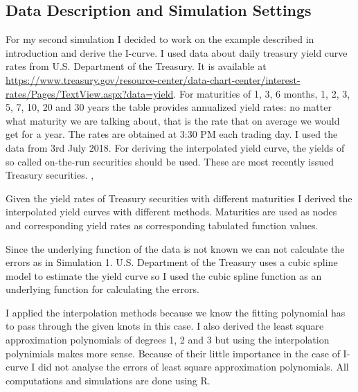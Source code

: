 \documentclass[a4paper,10pt]{article}
\begin{document}
\subsection{Data Description and Simulation Settings}
For my second simulation I decided to work on the example described in introduction and derive the I-curve. 
I used data about daily treasury yield curve rates from U.S. Department of the Treasury. 
It is available at \url{https://www.treasury.gov/resource-center/data-chart-center/interest-rates/Pages/TextView.aspx?data=yield}.
For maturities of 1, 3, 6 months, 1, 2, 3, 5, 7, 10, 20 and 30 years the table provides annualized yield rates: no matter what maturity we are talking about, that is the rate that on average we would get for a year.
The rates are obtained at 3:30 PM each trading day. I used the data from 3rd July 2018.
For deriving the interpolated yield curve, the yields of so called on-the-run securities should be used. These are most recently issued Treasury securities. \cite{podatki}, \cite{otr}

Given the yield rates of Treasury securities with different maturities I derived the interpolated yield curves with different methods.
Maturities are used as nodes and corresponding yield rates as corresponding tabulated function values.

Since the underlying function of the data is not known we can not calculate the errors as in Simulation 1. 
U.S. Department of the Treasury uses a cubic spline model to estimate the yield curve so I used the cubic spline function as an underlying function for calculating the errors. \cite{podatki}

I applied the interpolation methods because we know the fitting polynomial has to pass through the given knots in this case.
I also derived the least square approximation polynomials of degrees 1, 2 and 3 but using the interpolation polynimials makes more sense.
Because of their little importance in the case of I-curve I did not analyse the errors of least square approximation polynomials.
All computations and simulations are done using R.
\end{document}

